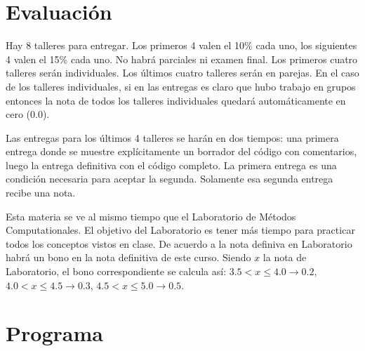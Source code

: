 \documentclass[11pt]{article}
\begin{document}
\section*{Evaluaci\'on}

Hay 8 talleres para entregar. Los primeros 4 valen el 10\% cada uno,
los siguientes 4 valen el 15\% cada uno. No habr\'a parciales ni
examen final. Los primeros cuatro talleres ser\'an individuales. Los
\'ultimos cuatro talleres ser\'an en parejas.  En el caso de los
talleres individuales, si en las entregas es claro que hubo trabajo en
grupos entonces la nota de todos los talleres individuales quedar\'a
autom\'aticamente en cero (0.0). 

Las entregas para los \'ultimos 4 talleres se har\'an en dos tiempos:
una primera entrega donde se muestre expl\'icitamente un borrador del
c\'odigo con comentarios, luego la entrega definitiva con el c\'odigo
completo. La primera entrega es una condici\'on necesaria para aceptar
la segunda. Solamente esa segunda entrega recibe una nota. 

Esta materia se ve al mismo tiempo que el Laboratorio de M\'etodos
Computationales. El objetivo del Laboratorio es tener m\'as tiempo
para practicar todos los conceptos vistos en clase. De acuerdo a la
nota definiva en Laboratorio habr\'a un bono en la nota definitiva de
este curso. Siendo $x$ la nota de Laboratorio, el bono correspondiente
se calcula as\'i:
$3.5< x \leq 4.0\rightarrow 0.2$, $4.0< x\leq 4.5\rightarrow 0.3$, $4.5<x
\leq 5.0\rightarrow 0.5$.



\section*{Programa}
\end{document}
